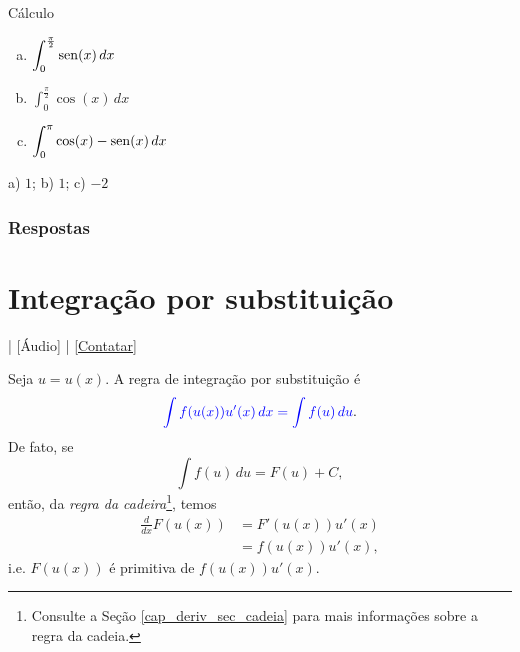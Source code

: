 \begin{exer}
  Cálculo
  \begin{enumerate}[a)]
  \item $\displaystyle \int_0^{\frac{\pi}{2}}\operatorname{sen}(x)\,dx$
  \item $\displaystyle \int_0^{\frac{\pi}{2}}\cos(x)\,dx$
  \item $\displaystyle \int_0^{\pi}\cos(x)-\operatorname{sen}(x)\,dx$
  \end{enumerate}
\end{exer}
\begin{resp}
  a) $1$; b) $1$; c) $-2$
\end{resp}

\ifisbook
\subsubsection{Respostas}
\shipoutAnswer
\fi


\section{Integração por substituição}\label{cap_int_sec_subs}

\begin{flushright}
  [Vídeo] | [Áudio] | \href{https://phkonzen.github.io/notas/contato.html}{[Contatar]}
\end{flushright}

Seja $u = u(x)$. A regra de integração por substituição é
\begin{equation}
  {\color{blue}\int f(u(x))u'(x)\,dx = \int f(u)\,du}.
\end{equation}
De fato, se
\begin{equation}
  \int f(u)\,du = F(u) + C,
\end{equation}
então, da \emph{regra da cadeira}\footnote{Consulte a Seção \ref{cap_deriv_sec_cadeia} para mais informações sobre a regra da cadeia.}, temos
\begin{align}
  \frac{d}{dx}F(u(x)) &= F'(u(x))u'(x) \\
                      &= f(u(x))u'(x),
\end{align}
i.e. $F(u(x))$ é primitiva de $f(u(x))u'(x)$.


